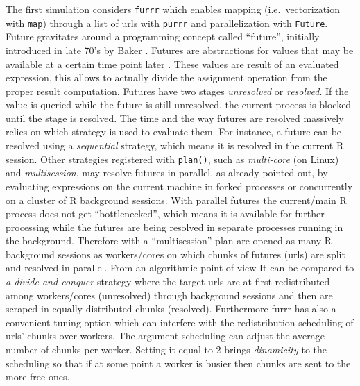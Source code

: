 \documentclass[
  12pt,
  a4paper,
  oneside]{book}
\newcommand{\passthrough}[1]{#1}
\theoremstyle{definition}
\theoremstyle{definition}
\theoremstyle{definition}
\theoremstyle{remark}
\begin{document}
The first simulation considers \passthrough{\lstinline!furrr!} which enables mapping (i.e.~vectorization with \passthrough{\lstinline!map!}) through a list of urls with \passthrough{\lstinline!purrr!} and parallelization with \passthrough{\lstinline!Future!}. Future gravitates around a programming concept called ``future'', initially introduced in late 70's by Baker \citep{BakerFuture}. Futures are abstractions for values that may be available at a certain time point later \citeyearpar{future}.
These values are result of an evaluated expression, this allows to actually divide the assignment operation from the proper result computation. Futures have two stages \emph{unresolved} or \emph{resolved}. If the value is queried while the future is still unresolved, the current process is blocked until the stage is resolved. The time and the way futures are resolved massively relies on which strategy is used to evaluate them. For instance, a future can be resolved using a \emph{sequential} strategy, which means it is resolved in the current R session. Other strategies registered with \passthrough{\lstinline!plan()!}, such as \emph{multi-core} (on Linux) and \emph{multisession}, may resolve futures in parallel, as already pointed out, by evaluating expressions on the current machine in forked processes or concurrently on a cluster of R background sessions.
With parallel futures the current/main R process does not get ``bottlenecked'', which means it is available for further processing while the futures are being resolved in separate processes running in the background. Therefore with a ``multisession'' plan are opened as many R background sessions as workers/cores on which chunks of futures (urls) are split and resolved in parallel. From an algorithmic point of view It can be compared to \emph{a divide and conquer} strategy where the target urls are at first redistributed among workers/cores (unresolved) through background sessions and then are scraped in equally distributed chunks (resolved).
Furthermore furrr has also a convenient tuning option which can interfere with the redistribution scheduling of urls' chunks over workers. The argument scheduling can adjust the average number of chunks per worker. Setting it equal to 2 brings \emph{dinamicity} \citeyearpar{furrr} to the scheduling so that if at some point a worker is busier then chunks are sent to the more free ones.
\end{document}

